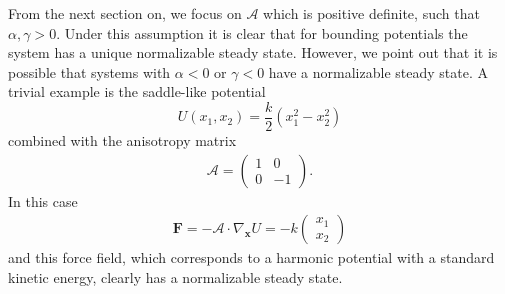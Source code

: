 From the next section on, we focus on $\mathcal{A}$ which is positive definite, such that $\alpha,\gamma>0$. Under this assumption it is clear that for bounding potentials the system has a unique normalizable steady state. However, we point out that it is possible that systems with $\alpha<0$ or $\gamma<0$ have a normalizable steady state. A trivial example is the saddle-like potential
\begin{equation}
    U(x_1,x_2)=\frac{k}{2}(x_1^2-x_2^2)
\end{equation}
combined with the anisotropy matrix
\begin{eqnarray}
    \mathcal{A} = \begin{pmatrix}
         1 & 0 \\
         0 & -1
    \end{pmatrix}.
\end{eqnarray}
In this case 
\begin{eqnarray}
    \mathbf{F} = -\mathcal{A}\cdot\nabla_{\mathbf{x}} U= -k\begin{pmatrix}
        x_1\\
        x_2
    \end{pmatrix}
\end{eqnarray}
and this force field, which corresponds to a harmonic potential with a standard kinetic energy, clearly has a normalizable steady state. 



